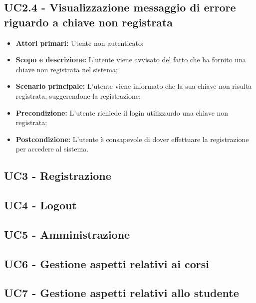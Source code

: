 \documentclass[AnalisiDeiRequisiti.tex]{subfiles}
\begin{document}
\subsection{UC2.4 - Visualizzazione messaggio di errore riguardo a chiave non registrata}
\begin{itemize}
	\item \textbf{Attori primari:} Utente non autenticato;\\
	\item \textbf{Scopo e descrizione:} L'utente viene avvisato del fatto che ha fornito una chiave non registrata nel sistema;\\
	\item \textbf{Scenario principale:} L'utente viene informato che la sua chiave non risulta registrata, suggerendone la registrazione;\\
	\item \textbf{Precondizione:} L'utente richiede il login utilizzando una chiave non registrata;\\
	\item \textbf{Postcondizione:} L'utente è consapevole di dover effettuare la registrazione per accedere al sistema.\\
\end{itemize}

\subsection{UC3 - Registrazione}

\subsection{UC4 - Logout}

\subsection{UC5 - Amministrazione}

\subsection{UC6 - Gestione aspetti relativi ai corsi}

\subsection{UC7 - Gestione aspetti relativi allo studente}
\end{document}
